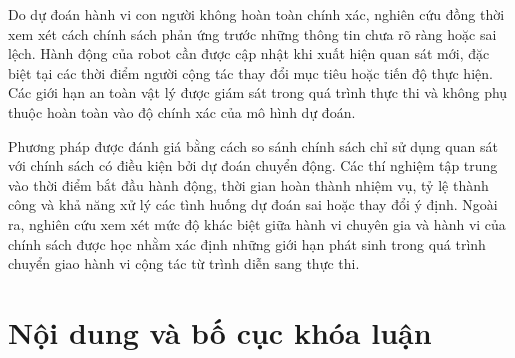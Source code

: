 Do dự đoán hành vi con người không hoàn toàn chính xác, nghiên cứu đồng thời xem xét cách chính sách phản ứng trước những thông tin chưa rõ ràng hoặc sai lệch. Hành động của robot cần được cập nhật khi xuất hiện quan sát mới, đặc biệt tại các thời điểm người cộng tác thay đổi mục tiêu hoặc tiến độ thực hiện. Các giới hạn an toàn vật lý được giám sát trong quá trình thực thi và không phụ thuộc hoàn toàn vào độ chính xác của mô hình dự đoán.

Phương pháp được đánh giá bằng cách so sánh chính sách chỉ sử dụng quan sát với chính sách có điều kiện bởi dự đoán chuyển động. Các thí nghiệm tập trung vào thời điểm bắt đầu hành động, thời gian hoàn thành nhiệm vụ, tỷ lệ thành công và khả năng xử lý các tình huống dự đoán sai hoặc thay đổi ý định. Ngoài ra, nghiên cứu xem xét mức độ khác biệt giữa hành vi chuyên gia và hành vi của chính sách được học nhằm xác định những giới hạn phát sinh trong quá trình chuyển giao hành vi cộng tác từ trình diễn sang thực thi.

\section{Nội dung và bố cục khóa luận}


